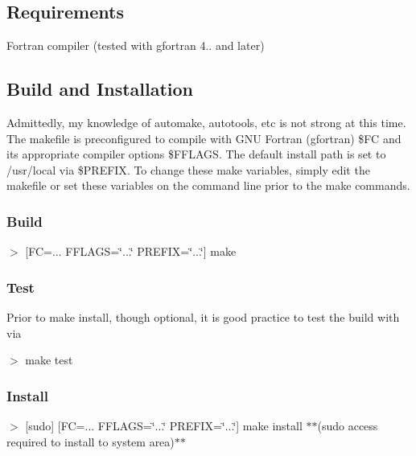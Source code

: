 \subsection*{Requirements}


\begin{DoxyItemize}
\item Fortran compiler (tested with gfortran 4.. and later)
\end{DoxyItemize}

\subsection*{Build and Installation}

Admittedly, my knowledge of automake, autotools, etc is not strong at this time. The makefile is preconfigured to compile with G\+NU Fortran (gfortran) {\ttfamily \$\+FC} and its appropriate compiler options {\ttfamily \$\+F\+F\+L\+A\+GS}. The default install path is set to {\ttfamily /usr/local} via {\ttfamily \$\+P\+R\+E\+F\+IX}. To change these make variables, simply edit the makefile or set these variables on the command line prior to the make commands.

\subsubsection*{Build}

{\ttfamily $>$ \mbox{[}FC=... F\+F\+L\+A\+GS=\char`\"{}...\char`\"{} P\+R\+E\+F\+IX=\char`\"{}...\char`\"{}\mbox{]} make}

\subsubsection*{Test}

Prior to {\ttfamily make install}, though optional, it is good practice to test the build with via

{\ttfamily $>$ make test}

\subsubsection*{Install}

{\ttfamily $>$ \mbox{[}sudo\mbox{]} \mbox{[}FC=... F\+F\+L\+A\+GS=\char`\"{}...\char`\"{} P\+R\+E\+F\+IX=\char`\"{}...\char`\"{}\mbox{]} make install} $\ast$$\ast$(sudo access required to install to system area)$\ast$$\ast$ 